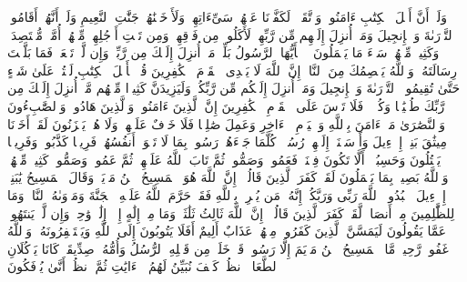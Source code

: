 \stopbuffer
\startbuffer[\q:5:65]
وَلَوۡ أَنَّ أَهۡلَ ٱلۡكِتَٰبِ ءَامَنُوا۟ وَٱتَّقَوۡا۟ لَكَفَّرۡنَا عَنۡهُمۡ سَیِّءَاتِهِمۡ وَلَأَدۡخَلۡنَٰهُمۡ جَنَّٰتِ ٱلنَّعِیمِ%
\stopbuffer
\startbuffer[\q:5:66]
وَلَوۡ أَنَّهُمۡ أَقَامُوا۟ ٱلتَّوۡرَىٰةَ وَٱلۡإِنجِیلَ وَمَاۤ أُنزِلَ إِلَیۡهِم مِّن رَّبِّهِمۡ لَأَكَلُوا۟ مِن فَوۡقِهِمۡ وَمِن تَحۡتِ أَرۡجُلِهِمۚ مِّنۡهُمۡ أُمَّةࣱ مُّقۡتَصِدَةࣱۖ وَكَثِیرࣱ مِّنۡهُمۡ سَاۤءَ مَا یَعۡمَلُونَ%
\stopbuffer
\startbuffer[\q:5:67]
۞ یَٰۤأَیُّهَا ٱلرَّسُولُ بَلِّغۡ مَاۤ أُنزِلَ إِلَیۡكَ مِن رَّبِّكَۖ وَإِن لَّمۡ تَفۡعَلۡ فَمَا بَلَّغۡتَ رِسَالَتَهُۥۚ وَٱللَّهُ یَعۡصِمُكَ مِنَ ٱلنَّاسِۗ إِنَّ ٱللَّهَ لَا یَهۡدِی ٱلۡقَوۡمَ ٱلۡكَٰفِرِینَ%
\stopbuffer
\startbuffer[\q:5:68]
قُلۡ یَٰۤأَهۡلَ ٱلۡكِتَٰبِ لَسۡتُمۡ عَلَىٰ شَیۡءٍ حَتَّىٰ تُقِیمُوا۟ ٱلتَّوۡرَىٰةَ وَٱلۡإِنجِیلَ وَمَاۤ أُنزِلَ إِلَیۡكُم مِّن رَّبِّكُمۡۗ وَلَیَزِیدَنَّ كَثِیرࣰا مِّنۡهُم مَّاۤ أُنزِلَ إِلَیۡكَ مِن رَّبِّكَ طُغۡیَٰنࣰا وَكُفۡرࣰاۖ فَلَا تَأۡسَ عَلَى ٱلۡقَوۡمِ ٱلۡكَٰفِرِینَ%
\stopbuffer
\startbuffer[\q:5:69]
إِنَّ ٱلَّذِینَ ءَامَنُوا۟ وَٱلَّذِینَ هَادُوا۟ وَٱلصَّٰبِءُونَ وَٱلنَّصَٰرَىٰ مَنۡ ءَامَنَ بِٱللَّهِ وَٱلۡیَوۡمِ ٱلۡءَاخِرِ وَعَمِلَ صَٰلِحࣰا فَلَا خَوۡفٌ عَلَیۡهِمۡ وَلَا هُمۡ یَحۡزَنُونَ%
\stopbuffer
\startbuffer[\q:5:70]
لَقَدۡ أَخَذۡنَا مِیثَٰقَ بَنِیۤ إِسۡرَٰۤءِیلَ وَأَرۡسَلۡنَاۤ إِلَیۡهِمۡ رُسُلࣰاۖ كُلَّمَا جَاۤءَهُمۡ رَسُولُۢ بِمَا لَا تَهۡوَىٰۤ أَنفُسُهُمۡ فَرِیقࣰا كَذَّبُوا۟ وَفَرِیقࣰا یَقۡتُلُونَ%
\stopbuffer
\startbuffer[\q:5:71]
وَحَسِبُوۤا۟ أَلَّا تَكُونَ فِتۡنَةࣱ فَعَمُوا۟ وَصَمُّوا۟ ثُمَّ تَابَ ٱللَّهُ عَلَیۡهِمۡ ثُمَّ عَمُوا۟ وَصَمُّوا۟ كَثِیرࣱ مِّنۡهُمۡۚ وَٱللَّهُ بَصِیرُۢ بِمَا یَعۡمَلُونَ%
\stopbuffer
\startbuffer[\q:5:72]
لَقَدۡ كَفَرَ ٱلَّذِینَ قَالُوۤا۟ إِنَّ ٱللَّهَ هُوَ ٱلۡمَسِیحُ ٱبۡنُ مَرۡیَمَۖ وَقَالَ ٱلۡمَسِیحُ یَٰبَنِیۤ إِسۡرَٰۤءِیلَ ٱعۡبُدُوا۟ ٱللَّهَ رَبِّی وَرَبَّكُمۡۖ إِنَّهُۥ مَن یُشۡرِكۡ بِٱللَّهِ فَقَدۡ حَرَّمَ ٱللَّهُ عَلَیۡهِ ٱلۡجَنَّةَ وَمَأۡوَىٰهُ ٱلنَّارُۖ وَمَا لِلظَّٰلِمِینَ مِنۡ أَنصَارࣲ%
\stopbuffer
\startbuffer[\q:5:73]
لَّقَدۡ كَفَرَ ٱلَّذِینَ قَالُوۤا۟ إِنَّ ٱللَّهَ ثَالِثُ ثَلَٰثَةࣲۘ وَمَا مِنۡ إِلَٰهٍ إِلَّاۤ إِلَٰهࣱ وَٰحِدࣱۚ وَإِن لَّمۡ یَنتَهُوا۟ عَمَّا یَقُولُونَ لَیَمَسَّنَّ ٱلَّذِینَ كَفَرُوا۟ مِنۡهُمۡ عَذَابٌ أَلِیمٌ%
\stopbuffer
\startbuffer[\q:5:74]
أَفَلَا یَتُوبُونَ إِلَى ٱللَّهِ وَیَسۡتَغۡفِرُونَهُۥۚ وَٱللَّهُ غَفُورࣱ رَّحِیمࣱ%
\stopbuffer
\startbuffer[\q:5:75]
مَّا ٱلۡمَسِیحُ ٱبۡنُ مَرۡیَمَ إِلَّا رَسُولࣱ قَدۡ خَلَتۡ مِن قَبۡلِهِ ٱلرُّسُلُ وَأُمُّهُۥ صِدِّیقَةࣱۖ كَانَا یَأۡكُلَانِ ٱلطَّعَامَۗ ٱنظُرۡ كَیۡفَ نُبَیِّنُ لَهُمُ ٱلۡءَایَٰتِ ثُمَّ ٱنظُرۡ أَنَّىٰ یُؤۡفَكُونَ%
\stopbuffer
\startbuffer[\q:5:76]
